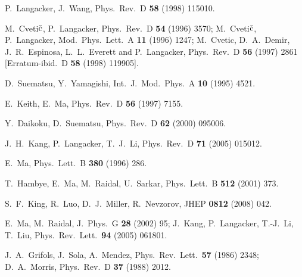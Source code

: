 \documentclass[12pt,a4paper]{article}
\begin{document}
\begin{thebibliography}{999}
P.~Langacker, J.~Wang,
Phys.\ Rev.\  D {\bf 58} (1998) 115010.


M.~Cveti$\check{\rm c}$, P.~Langacker, Phys.\ Rev.\ D {\bf 54} (1996) 3570;
M.~Cveti$\check{\rm c}$, P.~Langacker, Mod.\ Phys.\ Lett.\ A {\bf 11} (1996) 1247;
M.~Cvetic, D.~A.~Demir, J.~R.~Espinosa, L.~L.~Everett and P.~Langacker,
Phys.\ Rev.\ D {\bf 56} (1997) 2861 [Erratum-ibid.\ D {\bf 58} (1998) 119905].


D.~Suematsu, Y.~Yamagishi,
Int.\ J.\ Mod.\ Phys.\  A {\bf 10} (1995) 4521.

E.~Keith, E.~Ma,
Phys.\ Rev.\  D {\bf 56} (1997) 7155.

Y.~Daikoku, D.~Suematsu,
Phys.\ Rev.\  D {\bf 62} (2000) 095006.


J.~H.~Kang, P.~Langacker, T.~J.~Li,
Phys.\ Rev.\  D {\bf 71} (2005) 015012.

E.~Ma,
Phys.\ Lett.\  B {\bf 380} (1996) 286.

T.~Hambye, E.~Ma, M.~Raidal, U.~Sarkar,
Phys.\ Lett.\  B {\bf 512} (2001) 373.


S.~F.~King, R.~Luo, D.~J.~Miller, R.~Nevzorov,
JHEP {\bf 0812} (2008) 042.

E.~Ma, M.~Raidal, J.\ Phys.\ G {\bf 28} (2002) 95;
J.~Kang, P.~Langacker, T.-J.~Li, T.~Liu, Phys.\ Rev.\ Lett.\ {\bf 94} (2005) 061801.

J.~A.~Grifols, J.~Sola, A.~Mendez,
Phys.\ Rev.\ Lett.\  {\bf 57} (1986) 2348;
D.~A.~Morris,
Phys.\ Rev.\  D {\bf 37} (1988) 2012.


\end{thebibliography}
\end{document}
